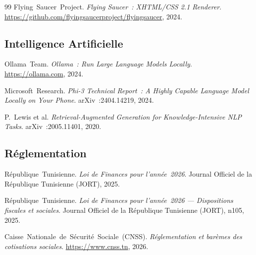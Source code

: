 \begin{thebibliography}{99}
  Flying~Saucer~Project.
  \emph{Flying Saucer~: XHTML/CSS 2.1 Renderer}.
  \url{https://github.com/flyingsaucerproject/flyingsaucer}, 2024.

\subsection*{Intelligence Artificielle}

  Ollama~Team.
  \emph{Ollama~: Run Large Language Models Locally}.
  \url{https://ollama.com}, 2024.

  Microsoft~Research.
  \emph{Phi-3 Technical Report~: A Highly Capable Language Model
  Locally on Your Phone}.
  arXiv~:2404.14219, 2024.

  P.~Lewis et al.
  \emph{Retrieval-Augmented Generation for Knowledge-Intensive
  NLP Tasks}.
  arXiv~:2005.11401, 2020.

\subsection*{Réglementation}

  République~Tunisienne.
  \emph{Loi de Finances pour l'année~2026}.
  Journal Officiel de la République Tunisienne (JORT), 2025.

  République~Tunisienne.
  \emph{Loi de Finances pour l'année~2026 --- Dispositions fiscales et sociales}.
  Journal Officiel de la République Tunisienne (JORT), n\textdegree{}105, 2025.

  Caisse~Nationale~de~Sécurité~Sociale~(CNSS).
  \emph{Réglementation et barèmes des cotisations sociales}.
  \url{https://www.cnss.tn}, 2026.

\end{thebibliography}